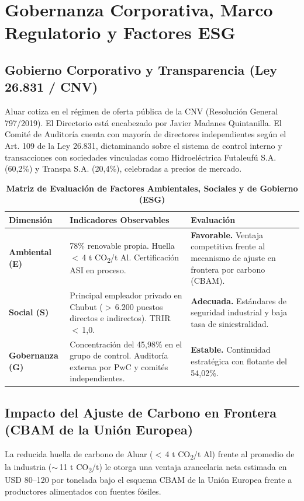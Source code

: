 \documentclass[11pt,a4paper]{article}
\begin{document}
\section{Gobernanza Corporativa, Marco Regulatorio y Factores ESG}

\subsection{Gobierno Corporativo y Transparencia (Ley 26.831 / CNV)}
Aluar cotiza en el régimen de oferta pública de la CNV (Resolución General 797/2019). El Directorio está encabezado por Javier Madanes Quintanilla. El Comité de Auditoría cuenta con mayoría de directores independientes según el Art. 109 de la Ley 26.831, dictaminando sobre el sistema de control interno y transacciones con sociedades vinculadas como Hidroeléctrica Futaleufú S.A. (60,2\%) y Transpa S.A. (20,4\%), celebradas a precios de mercado.

\begin{table}[H]
\centering
\caption{\textbf{Matriz de Evaluación de Factores Ambientales, Sociales y de Gobierno (ESG)}}
\scriptsize
\begin{tabularx}{\textwidth}{p{2.5cm}Xp{4.2cm}}
\toprule
\textbf{Dimensión} & \textbf{Indicadores Observables} & \textbf{Evaluación} \\
\midrule
\textbf{Ambiental (E)} & 78\% renovable propia. Huella $<$\,4 t CO\textsubscript{2}/t Al. Certificación ASI en proceso. & \textbf{Favorable.} Ventaja competitiva frente al mecanismo de ajuste en frontera por carbono (CBAM). \\
\textbf{Social (S)} & Principal empleador privado en Chubut ($>$\,6.200 puestos directos e indirectos). TRIR $<$\,1,0. & \textbf{Adecuada.} Estándares de seguridad industrial y baja tasa de siniestralidad. \\
\textbf{Gobernanza (G)} & Concentración del 45,98\% en el grupo de control. Auditoría externa por PwC y comités independientes. & \textbf{Estable.} Continuidad estratégica con flotante del 54,02\%. \\
\bottomrule
\end{tabularx}
\end{table}

\subsection{Impacto del Ajuste de Carbono en Frontera (CBAM de la Unión Europea)}
La reducida huella de carbono de Aluar ($<$\,4 t CO\textsubscript{2}/t Al) frente al promedio de la industria ($\sim$\,11 t CO\textsubscript{2}/t) le otorga una ventaja arancelaria neta estimada en USD 80--120 por tonelada bajo el esquema CBAM de la Unión Europea frente a productores alimentados con fuentes fósiles.
\end{document}
